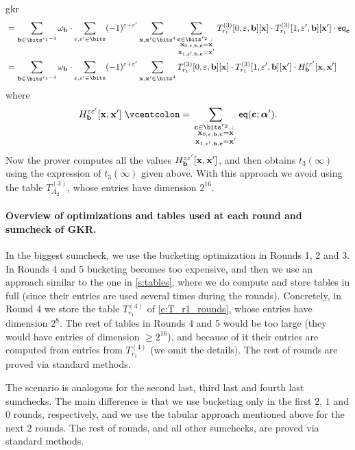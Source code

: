 \begin{lncsappendix}{gkr}
\begin{align*}
 &=\sum_{\bb\in \bits^{r_1-4}} \omega_\bb\cdot \sum_{\eps,\eps'\in \bits}(-1)^{\eps+\eps'} \sum_{\xx,\xx'\in \bits^{4}} \sum_{\substack{\cc\in \bits^{r_2} \ : \ \\ \xx_{0,\eps,\bb,\cc}=\xx\\ \xx_{1,\eps',\bb,\cc}=\xx'} } T_{r_1}^{(3)}[0,\eps,\bb][\xx] \cdot  T_{r_1}^{(3)}[1,\eps',\bb][\xx'] \cdot\eq_\cc\\
 &=\sum_{\bb\in \bits^{r_1-4}} \omega_\bb\cdot \sum_{\eps,\eps'\in \bits}(-1)^{\eps+\eps'} \sum_{\xx,\xx'\in \bits^{4}}  T_{r_1}^{(3)}[0,\eps,\bb][\xx] \cdot  T_{r_1}^{(3)}[1,\eps',\bb][\xx'] \cdot H^{\eps\eps'}_{\bb}[\xx, \xx']
\end{align*}
%
where
%
$$
H^{\eps\eps'}_{\bb}[\xx,\xx']\defeq \sum_{\substack{\cc\in \bits^{r_2} \ : \ \\ \xx_{0,\eps,\bb,\cc}=\xx\\ \xx_{1,\eps',\bb,\cc}=\xx'} }\eq(\cc;\bm{\alpha}').
$$
Now the prover computes all the values $H^{\varepsilon\varepsilon'}_{\mathbf{b}}[\mathbf{x},\mathbf{x}']$, and then obtains $t_3(\infty)$ using the expression of $t_3(\infty)$ given above. With this approach we avoid using the table $T_{A_2}^{(3)}$, whose entries have  dimension $2^{16}$. %


\paragraph{Overview of  optimizations and tables used at each round and sumcheck of GKR.} In the biggest sumcheck, we use the bucketing optimization in Rounds 1, 2 and 3. In Rounds 4 and 5  bucketing becomes too expensive, and then we  use an approach similar to the one in \cref{s:tables}, where we do compute and store tables in full (since their entries are used several times during the rounds). Concretely, in Round 4 we store the table $T_{r_1}^{(4)}$ of \eqref{e:T_r1_rounds}, whose entries have dimension $2^8$. The rest of tables in Rounds 4 and 5 would be too large (they would have entries of dimension $\geq 2^{16}$), and because of it their entries are computed from entries from  $T_{r_1}^{(4)}$ (we omit the details). The rest of rounds are proved via standard methods.


The scenario is analogous for the second last, third last and fourth last sumchecks. The main difference is that we use bucketing only in the first $2$, $1$ and $0$ rounds, respectively, and we use the tabular approach mentioned above for the next $2$ rounds. The rest of rounds, and all other sumchecks, are proved via standard methods.


\end{lncsappendix}
